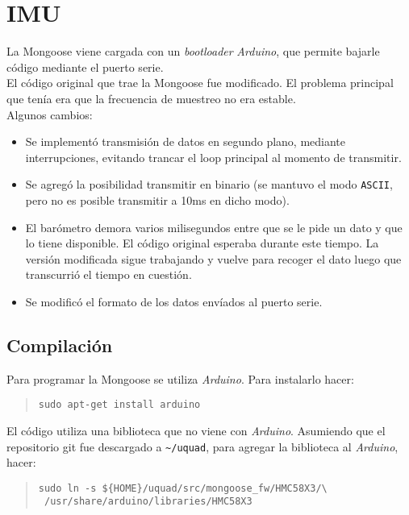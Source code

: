 \documentclass[main]{subfiles}
\begin{document}
\section{IMU}
\label{sec:codigo:imu}

La Mongoose viene cargada con un \textit{bootloader} \textit{Arduino}, que permite bajarle código mediante el puerto serie.\\

El código original que trae la Mongoose fue modificado. El problema principal que tenía era que la frecuencia de muestreo no era estable.\\

Algunos cambios:
\begin{itemize}
\item Se implementó transmisión de datos en segundo plano, mediante interrupciones, evitando trancar el loop principal al momento de transmitir.
\item Se agregó la posibilidad transmitir en binario (se mantuvo el modo \verb+ASCII+, pero no es posible transmitir a 10ms en dicho modo).
\item El barómetro demora varios milisegundos entre que se le pide un dato y que lo tiene disponible. El código original esperaba durante este tiempo. La versión modificada sigue trabajando y vuelve para recoger el dato luego que transcurrió el tiempo en cuestión.
\item Se modificó el formato de los datos envíados al puerto serie.
\end{itemize}

\subsection{Compilación}
\label{sec:codigo:compilacion-mongoose}

Para programar la Mongoose se utiliza \textit{Arduino}. Para instalarlo hacer:
\begin{quote}
\begin{verbatim}
sudo apt-get install arduino
\end{verbatim}
\end{quote}

El código utiliza una biblioteca que no viene con \textit{Arduino}. Asumiendo que el repositorio git fue descargado a \verb+~/uquad+, para agregar la biblioteca al \textit{Arduino}, hacer:
\begin{quote}
\begin{verbatim}
sudo ln -s ${HOME}/uquad/src/mongoose_fw/HMC58X3/\
 /usr/share/arduino/libraries/HMC58X3
\end{verbatim}
\end{quote}
\end{document}
